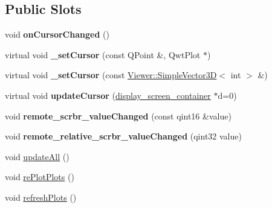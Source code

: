 \subsection*{Public Slots}
\begin{DoxyCompactItemize}
\item 
\mbox{\label{classScreen__manager__ImageData_aa862cab6cf8d631117550f5e1db6da67}} 
void {\bfseries on\+Cursor\+Changed} ()
\item 
\mbox{\label{classScreen__manager__ImageData_ae20130e2cad07bc6b88917cea5408691}} 
virtual void {\bfseries \+\_\+set\+Cursor} (const Q\+Point \&, Qwt\+Plot $\ast$)
\item 
\mbox{\label{classScreen__manager__ImageData_aeeada64fe7a1c797dc601dfc221b6713}} 
virtual void {\bfseries \+\_\+set\+Cursor} (const \mbox{\hyperlink{classViewer_1_1SimpleVector3D}{Viewer\+::\+Simple\+Vector3D}}$<$ int $>$ \&)
\item 
\mbox{\label{classScreen__manager__ImageData_a0da8dec9cda46dcaa0011d1b666490e9}} 
virtual void {\bfseries update\+Cursor} (\mbox{\hyperlink{classdisplay__screen__container}{display\+\_\+screen\+\_\+container}} $\ast$d=0)
\item 
\mbox{\label{classScreen__manager_ac91e8b023e12dc15f8c6ab1951b4ce70}} 
void {\bfseries remote\+\_\+scrbr\+\_\+value\+Changed} (const qint16 \&value)
\item 
\mbox{\label{classScreen__manager_acfda6fcca2edd2d2a155b000256dad56}} 
void {\bfseries remote\+\_\+relative\+\_\+scrbr\+\_\+value\+Changed} (qint32 value)
\item 
void \mbox{\hyperlink{classScreen__manager_afc206ddd1fee12c08d890d7a0c4c5fcb}{update\+All}} ()
\item 
void \mbox{\hyperlink{classScreen__manager_a0a17fba71b72fedefed5651b883ed371}{re\+Plot\+Plots}} ()
\item 
void \mbox{\hyperlink{classScreen__manager_a846061886a15cdc0de881976564b02f2}{refresh\+Plots}} ()
\end{DoxyCompactItemize}
